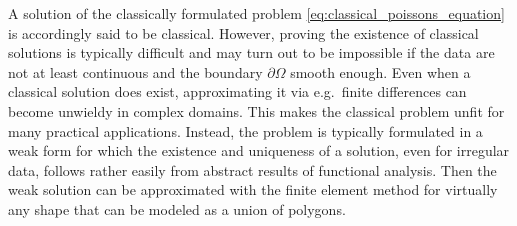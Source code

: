 \documentclass[english, 12pt, a4paper, sci, utf8, a-2b, online]{aaltothesis}
\theoremstyle{definition}
\theoremstyle{plain}
\numberwithin{equation}{section}
\begin{document}
A solution of the classically formulated problem 
\eqref{eq:classical_poissons_equation} is accordingly said to be classical.
However, proving the existence of classical solutions is typically difficult
and may turn out to be impossible if the data are not at least continuous
and the boundary $\partial \Omega$ smooth enough.
Even when a classical solution does exist, approximating it via
e.g.\ finite differences can become unwieldy in complex domains.
This makes the classical problem unfit for many practical applications.
Instead, the problem is typically formulated in a weak form for which
the existence and uniqueness of a solution, even for irregular data,
follows rather easily from abstract results of functional analysis.
Then the weak solution can be approximated
with the finite element method for virtually any shape that can be modeled
as a union of polygons.
\end{document}
